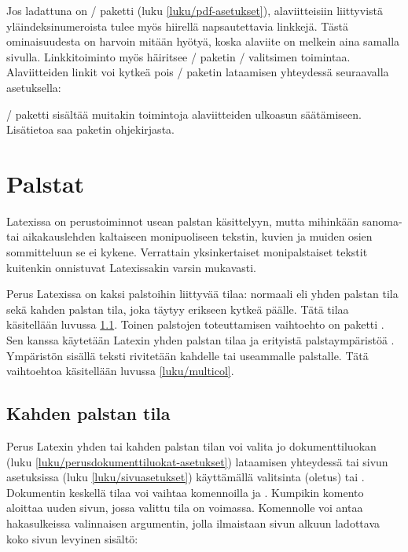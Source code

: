 Jos ladattuna on \-/ paketti (luku
\ref{luku/pdf-asetukset}), alaviitteisiin liittyvistä
yläindeksinumeroista tulee myös hiirellä napsautettavia linkkejä. Tästä
ominaisuudesta on harvoin mitään hyötyä, koska alaviite on melkein aina
samalla sivulla. Linkkitoiminto myös häiritsee \-/
paketin \-/ valitsimen toimintaa. Alaviitteiden linkit
voi kytkeä pois \-/ paketin lataamisen yhteydessä
seuraavalla asetuksella:

\begin{koodilohkosis}
\usepackage[hyperfootnotes=false]{hyperref}
\end{koodilohkosis}

\noindent
{}\-/ paketti sisältää muitakin toimintoja alaviitteiden
ulkoasun säätämiseen. Lisätietoa saa paketin ohjekirjasta.

\section{Palstat}
\label{luku/palstat}

Latexissa on perustoiminnot usean palstan käsittelyyn, mutta mihinkään
sanoma- tai aikakauslehden kaltaiseen monipuoliseen tekstin, kuvien ja
muiden osien sommitteluun se ei kykene. Verrattain yksinkertaiset
monipalstaiset tekstit kuitenkin onnistuvat Latexissakin varsin
mukavasti.

Perus Latexissa on kaksi palstoihin liittyvää tilaa: normaali eli yhden
palstan tila sekä kahden palstan tila, joka täytyy erikseen kytkeä
päälle. Tätä tilaa käsitellään luvussa \ref{luku/kahden-palstan-tila}.
Toinen palstojen toteuttamisen vaihtoehto on paketti
. Sen kanssa käytetään Latexin yhden palstan tilaa ja
erityistä palstaympäristöä . Ympäristön sisällä
teksti rivitetään kahdelle tai useammalle palstalle. Tätä vaihtoehtoa
käsitellään luvussa \ref{luku/multicol}.

\subsection{Kahden palstan tila}
\label{luku/kahden-palstan-tila}

Perus Latexin yhden tai kahden palstan tilan voi valita jo
dokumenttiluokan (luku \ref{luku/perusdokumenttiluokat-asetukset})
lataamisen yhteydessä tai sivun asetuksissa (luku
\ref{luku/sivuasetukset}) käyttämällä valitsinta 
(oletus) tai . Dokumentin keskellä tilaa voi vaihtaa
komennoilla  ja . Kumpikin komento
aloittaa uuden sivun, jossa valittu tila on voimassa. Komennolle
 voi antaa hakasulkeissa valinnaisen argumentin,
jolla ilmaistaan sivun alkuun ladottava koko sivun levyinen sisältö:

